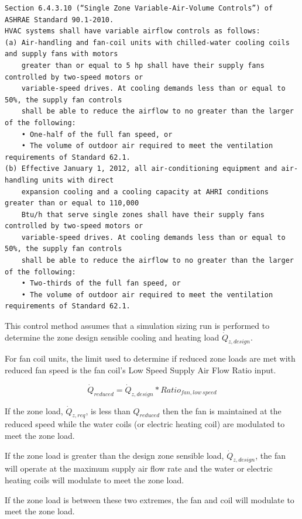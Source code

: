 \begin{lstlisting}
Section 6.4.3.10 (“Single Zone Variable-Air-Volume Controls”) of ASHRAE Standard 90.1-2010.
HVAC systems shall have variable airflow controls as follows:
(a) Air-handling and fan-coil units with chilled-water cooling coils and supply fans with motors
    greater than or equal to 5 hp shall have their supply fans controlled by two-speed motors or
    variable-speed drives. At cooling demands less than or equal to 50%, the supply fan controls
    shall be able to reduce the airflow to no greater than the larger of the following:
    • One-half of the full fan speed, or
    • The volume of outdoor air required to meet the ventilation requirements of Standard 62.1.
(b) Effective January 1, 2012, all air-conditioning equipment and air-handling units with direct
    expansion cooling and a cooling capacity at AHRI conditions greater than or equal to 110,000
    Btu/h that serve single zones shall have their supply fans controlled by two-speed motors or
    variable-speed drives. At cooling demands less than or equal to 50%, the supply fan controls
    shall be able to reduce the airflow to no greater than the larger of the following:
    • Two-thirds of the full fan speed, or
    • The volume of outdoor air required to meet the ventilation requirements of Standard 62.1.
\end{lstlisting}

This control method assumes that a simulation sizing run is performed to determine the zone design sensible cooling and heating load \({\dot Q_{z,design}}\).

For fan coil units, the limit used to determine if reduced zone loads are met with reduced fan speed is the fan coil's Low Speed Supply Air Flow Ratio input.

\begin{equation}
{\dot Q_{reduced}} = {\dot Q_{z,design}} * {Ratio_{fan,low~speed}}
\end{equation}

If the zone load, \({\dot Q_{z,req}}\), is less than \({Q_{reduced}}\) then the fan is maintained at the reduced speed while the water coils (or electric heating coil) are modulated to meet the zone load.

If the zone load is greater than the design zone sensible load, \({\dot Q_{z,design}}\), the fan will operate at the maximum supply air flow rate and the water or electric heating coils will modulate to meet the zone load.

If the zone load is between these two extremes, the fan and coil will modulate to meet the zone load.


